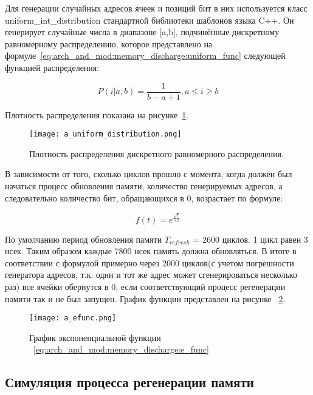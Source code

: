 Для генерации случайных адресов ячеек и позиций бит в них используется класс uniform\_int\_distribution стандартной библиотеки шаблонов языка C++. 
Он генерирует случайные числа в диапазоне [a,b], подчинённые дискретному равномерному распределению, которое представлено на формуле~\ref{eq:arch_and_mod:memory_discharge:uniform_func} следующей функцией распределения:

\begin{equation}
  \label{eq:arch_and_mod:memory_discharge:uniform_func}
  P(i|a,b) = \frac{1}
           {b-a+1}, a \le i \ge b
\end{equation}

Плотность распределения показана на рисунке~\ref{fig:arch_and_mod:modules:uniform_distribution}.

\begin{figure}[ht]
\centering
  \texttt{[image: a\_uniform\_distribution.png]}  
  \caption{ Плотность распределения дискретного равномерного распределения. }
  \label{fig:arch_and_mod:modules:uniform_distribution}
\end{figure}

В зависимости от того, сколько циклов прошло с момента, когда должен был начаться процесс обновления памяти, количество генерируемых адресов, а следовательно количество бит, обращающихся в 0, возрастает по формуле:

\begin{equation}
  \label{eq:arch_and_mod:memory_discharge:e_func}
  f(t) = e^{\frac{\sqrt{t}}
           {5.2}}
\end{equation}

По умолчанию период обновления памяти $T_{refresh}$ = 2600 циклов. 1 цикл равен 3 нсек. Таким образом каждые 7800 нсек память должна обновляться. В итоге в соответствии с формулой примерно через 2000 циклов(с учетом погрешности генератора адресов, т.к. один и тот же адрес может сгенерироваться несколько раз) все ячейки обернутся в 0, если соответствующий процесс регенерации памяти так и не был запущен. График функции представлен на рисунке ~\ref{fig:arch_and_mod:memory_discharge:efunc_grafic}.

\begin{figure}[ht]
\centering
  \texttt{[image: a\_efunc.png]}  
  \caption{ График экспоненциальной функции ~\ref{eq:arch_and_mod:memory_discharge:e_func} }
  \label{fig:arch_and_mod:memory_discharge:efunc_grafic}
\end{figure}

\subsection{Симуляция процесса регенерации памяти}
\label{sub:arch_and_mod:memory_refresh}

